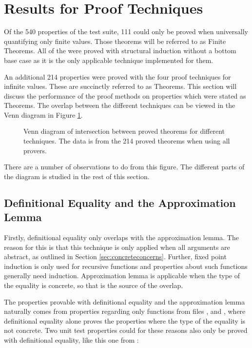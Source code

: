 \section{Results for Proof Techniques}

Of the 540 properties of the test suite, 111 could only be proved when
universally quantifying only finite values. Those theorems will
be referred to as Finite Theorems. All of the were proved with
structural induction without a bottom base case as it is the only
applicable technique implemented for them.

An additional 214 properties were proved with the four proof
techniques for infinite values. These are succinctly referred to as
Theorems. This section will discuss the performance of the proof
methods on properties which were stated as Theorems.  The overlap
between the different techniques can be viewed in the Venn diagram in
Figure \ref{fig:venn}.

\begin{figure}[h]
  \centering
  
  \caption{Venn diagram of intersection between proved theorems for
    different techniques. The data is from the 214 proved theorems
    when using all provers.
    \label{fig:venn}
  }
\end{figure}

There are a number of observations to do from this figure. The
different parts of the diagram is studied in the rest of this section.


\subsection{Definitional Equality and the Approximation Lemma}
\label{sec:defeqandapprox}

Firstly, definitional equality only overlaps with the approximation
lemma. The reason for this is that this technique is only applied when
all arguments are abstract, as outlined in Section
\ref{sec:concreteconcerns}. Further, fixed point induction is only
used for recursive functions and properties about such functions
generally need induction. Approximation lemma is applicable when the
type of the equality is concrete, so that is the source of the overlap.

The properties provable with definitional equality and the
approximation lemma naturally comes from properties regarding only
functions from files ,  and
, where definitional equality alone proves the
properties where the type of the equality is not concrete. Two
unit test properties could for these reasons also only be proved with
definitional equality, like this one from :

